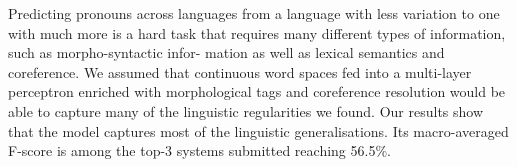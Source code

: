 Predicting pronouns across languages from a language with less variation to one with much more is a hard task that requires many different types of information, such as morpho-syntactic infor- mation as well as lexical semantics and coreference. We assumed that continuous word spaces fed into a multi-layer perceptron enriched with morphological tags and coreference resolution would be able to capture many of the linguistic regularities we found. Our results show that the model captures most of the linguistic generalisations. Its macro-averaged F-score is among the top-3 systems submitted reaching 56.5\%.
